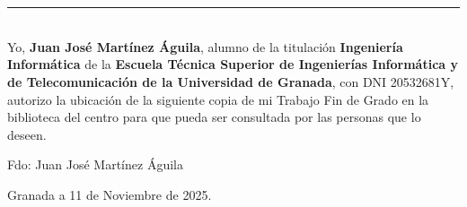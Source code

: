 \chapter*{}
\thispagestyle{empty}

\noindent\rule[-1ex]{\textwidth}{2pt}\\[4.5ex]

Yo, \textbf{Juan José Martínez Águila}, alumno de la titulación \textbf{Ingeniería Informática} de la \textbf{Escuela Técnica Superior
de Ingenierías Informática y de Telecomunicación de la Universidad de Granada}, con DNI 20532681Y, autorizo la
ubicación de la siguiente copia de mi Trabajo Fin de Grado en la biblioteca del centro para que pueda ser
consultada por las personas que lo deseen.

\vspace{6cm}

\noindent Fdo: Juan José Martínez Águila

\vspace{2cm}

\begin{flushright}
Granada a 11 de Noviembre de 2025.
\end{flushright}












